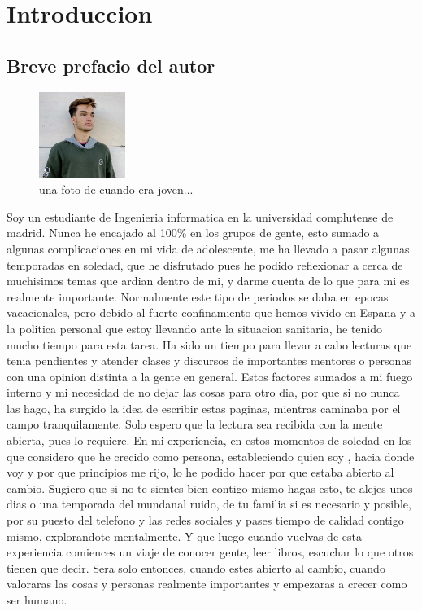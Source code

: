 
\chapter{Introduccion}
\section{Breve prefacio del autor}
\begin{figure}
	\centering
	\includegraphics[width=0.25\textwidth]{figures/mi_foto.jpeg}
	\caption{una foto de cuando era joven...}
\end{figure}

Soy un estudiante de Ingenieria informatica en la universidad complutense de madrid. Nunca he encajado al 100\% en los grupos de gente, esto sumado a algunas complicaciones en mi vida de adolescente, me ha llevado a pasar algunas temporadas en soledad, que he disfrutado pues he podido reflexionar a cerca de muchisimos temas que ardian dentro de mi, y darme cuenta de lo que para mi es realmente importante. 
Normalmente este tipo de periodos se daba en epocas vacacionales, pero debido al fuerte confinamiento que hemos vivido en Espana y a la politica personal que estoy llevando ante la situacion sanitaria, he tenido mucho tiempo para esta tarea. Ha sido un tiempo para llevar a cabo lecturas que tenia pendientes y atender clases y discursos de importantes mentores o personas con una opinion distinta a la gente en general.
Estos factores sumados a mi fuego interno y mi necesidad de no dejar las cosas para otro dia, por que si no nunca las hago, ha surgido la idea de escribir estas paginas, mientras caminaba por el campo tranquilamente.
Solo espero que la lectura sea recibida con la mente abierta, pues lo requiere. En mi experiencia, en estos momentos de soledad en los que considero que he crecido como persona, estableciendo quien soy , hacia donde voy y por que principios me rijo, lo he podido hacer por que estaba abierto al cambio. Sugiero que si no te sientes bien contigo mismo hagas esto, te alejes unos dias o una temporada del mundanal ruido, de tu familia si es necesario y posible, por su puesto del telefono y las redes sociales y pases tiempo de calidad contigo mismo, explorandote mentalmente. Y que luego cuando vuelvas de esta experiencia comiences un viaje de conocer gente, leer libros, escuchar lo que otros tienen que decir. Sera solo entonces, cuando estes abierto al cambio, cuando valoraras las cosas y personas realmente importantes y empezaras a crecer como ser humano. 
